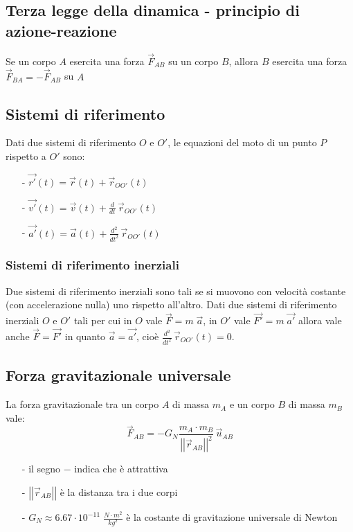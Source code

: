 \documentclass[a4paper]{article}
\newcommand\dt{\frac{d}{dt}\,}
\newcommand\dts{\frac{d^2}{dt^2}\,}
\newcommand\vmod[1]{\left|\left|{#1}\right|\right|}
\begin{document}
\subsection{Terza legge della dinamica - principio di azione-reazione}
Se un corpo \(A\) esercita una forza \(\vec{F}_{AB}\) su un corpo \(B\), allora \(B\) esercita una forza \(\vec{F}_{BA} = -\vec{F}_{AB}\) su \(A\)

\subsection{Sistemi di riferimento}
Dati due sistemi di riferimento \(O\) e \(O'\), le equazioni del moto di un punto \(P\) rispetto a \(O'\) sono:
\begin{itemize}[topsep=3pt, itemsep=0pt]
	\item[-] \(\vec{r'}(t) = \vec{r}(t) + \vec{r}_{OO'}(t)\)
	\item[-] \(\vec{v'}(t) = \vec{v}(t) + \dt \vec{r}_{OO'}(t)\)
	\item[-] \(\vec{a'}(t) = \vec{a}(t) + \dts \vec{r}_{OO'}(t)\)
\end{itemize}

\subsubsection*{Sistemi di riferimento inerziali}
Due sistemi di riferimento inerziali sono tali se si muovono con velocità costante (con accelerazione nulla) uno rispetto all'altro.
Dati due sistemi di riferimento inerziali \(O\) e \(O'\) tali per cui in \(O\) vale \(\vec{F} = m \; \vec{a}\), in \(O'\) vale \(\vec{F'} = m \; \vec{a'}\)
allora vale anche \(\vec{F} = \vec{F'}\) in quanto \(\vec{a} = \vec{a'}\), cioè \(\displaystyle \dts \vec{r}_{OO'}(t) = 0\).

\newpage


\subsection{Forza gravitazionale universale}
La forza gravitazionale tra un corpo \(A\) di massa \(m_A\) e un corpo \(B\) di massa \(m_B\) vale:
\[\vec{F}_{AB} = - G_N \frac{m_A \cdot m_B}{\vmod{\vec{r}_{AB}}^2} \, \vec{u}_{AB}\]

\begin{itemize}[topsep=3pt, itemsep=0pt]
	\item[-] il segno \(-\) indica che è attrattiva
	\item[-] \(\vmod{\vec{r}_{AB}}\) è la distanza tra i due corpi
	\item[-] \(\displaystyle G_N \approx 6.67 \cdot 10^{-11} \; \frac{N \cdot m^2}{kg^2}\) è la costante di gravitazione universale di Newton
\end{itemize}
\end{document}
